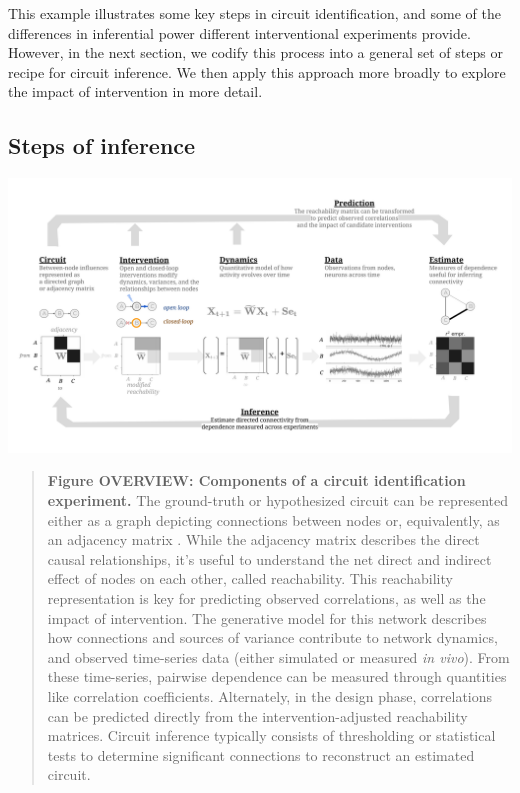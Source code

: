 \documentclass{article}
\begin{document}
This example illustrates some key steps in circuit identification, and some of the differences in inferential power different interventional experiments provide. However, in the next section, we codify this process into a general set of steps or recipe for circuit inference. We then apply this approach more broadly to explore the impact of intervention in more detail.

\hypertarget{steps-of-inference}{%
\subsection{Steps of inference}\label{steps-of-inference}}

\includegraphics[width=1.0\textwidth]{figures/core_figure_sketches/methods_overview_pipeline_sketch.png}

\begin{quote}
\textbf{Figure OVERVIEW: Components of a circuit identification experiment.} The ground-truth or hypothesized circuit can be represented either as a graph depicting connections between nodes or, equivalently, as an adjacency matrix \autocite{fornito2016connectivity}. While the adjacency matrix describes the direct causal relationships, it's useful to understand the net direct and indirect effect of nodes on each other, called reachability. This reachability representation is key for predicting observed correlations, as well as the impact of intervention. The generative model for this network describes how connections and sources of variance contribute to network dynamics, and observed time-series data (either simulated or measured \emph{in vivo}). From these time-series, pairwise dependence can be measured through quantities like correlation coefficients. Alternately, in the design phase, correlations can be predicted directly from the intervention-adjusted reachability matrices. Circuit inference typically consists of thresholding or statistical tests to determine significant connections to reconstruct an estimated circuit.
\end{quote}
\end{document}

